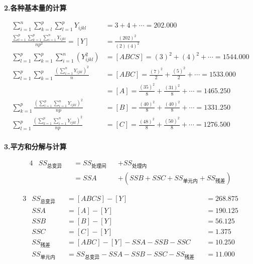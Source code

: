 \textbf{2.各种基本量的计算}

\begin{align*}
    \sum\limits_{i=1}^{n}\sum\limits_{k=l}^{p}\sum\limits_{l=1}^{p}Y_{ijkl}&=3+4+\cdots=202.000\\
    \frac{\sum\limits_{l=1}^p{\sum\limits_{k=1}^p{\sum\limits_{i=1}^n{Y_{ijkl}}}}}{np^2}=\left[ Y \right] &=\frac{\left( 202 \right) ^2}{\left( 2 \right) \left( 4 \right) ^2}\\
    \sum\limits_{l=1}^p{\sum\limits_{k=1}^p{\sum\limits_{i=1}^n{\left( Y_{ijkl}^{2} \right)}}}&=\left[ ABCS \right] =\left( 3 \right) ^2+\left( 4 \right) ^2+\cdots =1544.000\\
    \sum\limits_{l=1}^p{\sum\limits_{k=1}^p{\frac{\left( \sum\limits_{i=1}^n{Y_{ijkl}} \right) ^2}{n}}}&=\left[ ABC \right] =\frac{\left( 7 \right) ^2}{2}+\frac{\left( 5 \right) ^2}{2}+\cdots =1533.000\\
     &=\left[ A \right] =\frac{\left( 35 \right) ^2}{8}+\frac{\left( 31 \right) ^2}{8}+\cdots =1465.250\\
    \sum\limits_{k=1}^p{\frac{\left( \sum\limits_{l=1}^p{\sum\limits_{i=1}^n{Y_{ijkl}}} \right) ^2}{np}}&=\left[ B \right] =\frac{\left( 40 \right) ^2}{8}+\frac{\left( 40 \right) ^2}{8}+\cdots =1331.250\\
    \sum\limits_{l=1}^p{\frac{\left( \sum\limits_{k=1}^p{\sum\limits_{i=1}^n{Y_{ijkl}}} \right) ^2}{np}}&=\left[ C \right] =\frac{\left( 48 \right) ^2}{8}+\frac{\left( 50 \right) ^2}{8}+\cdots =1276.500\\
\end{align*}


\textbf{3.平方和分解与计算}
\begin{definition}[单因素拉丁方设计平方和分解]
    \begin{alignat*}{4}
       & SS_{\text{总变异}} & &= SS_{\text{处理间}} & & +SS_{\text{处理内}}\\
       &                    & &= SSA               & & +\left( SSB + SSC + SS_{\text{单元内}} + SS_{\text{残差}}  \right)
    \end{alignat*}
\end{definition}

\begin{alignat*}{3}
    & SS_{\text{总变异}} && =[ABCS]-[Y] && =268.875\\
    & SSA               &&  =[A]   - [Y] && =190.125\\
    &SSB               && =[B] -[Y]&&=56.125\\
    & SSC              && =[C]-[Y] &&= 1.375\\
    & SS_{\text{残差}} && = {[ABC]-[Y]}-SSA-SSB-SSC && =10.250\\
    & SS_{\text{单元内}} && = SS_{\text{总变异}}-SSA-SSB-SSC-SS_{\text{残差}} && = 11.000
\end{alignat*}


